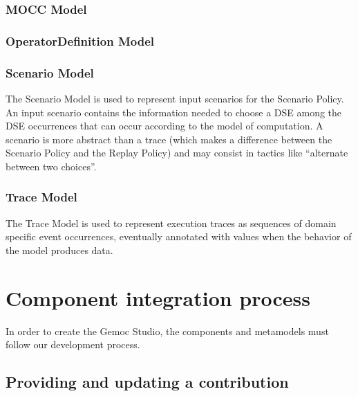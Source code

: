 \documentclass{gemoc} %
\begin{document}

\subsection{MOCC Model}


\subsection{OperatorDefinition Model}


\subsection{Scenario Model}
The Scenario Model is used to represent input scenarios for the Scenario Policy. An input scenario contains the information needed to choose a DSE among the DSE occurrences that can occur according to the model of computation. A scenario is more abstract than a trace (which makes a difference between the Scenario Policy and the Replay Policy) and may consist in tactics like ``alternate between two choices''.

\subsection{Trace Model}
The Trace Model is used to represent execution traces as sequences of domain specific event occurrences, eventually annotated with values when the behavior of the model produces data.


\chapter{Component integration process}
In  order to create the Gemoc Studio, the components and metamodels must follow our development process.

\section{Providing and updating a contribution}
\end{document}
